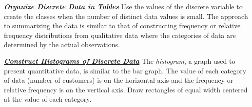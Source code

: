\documentclass{report}
\begin{document}
        \bigbreak \noindent \bigbreak \noindent 
        \textbf{\textit{\underline{Organize Discrete Data in Tables}}}
        \bigbreak \noindent 
        Use the values of the discrete variable to create the classes when the number of distinct data values is small. The approach to summarizing the data is similar to that of constructing frequency or relative frequency distributions from qualitative data where the categories of data are determined by the actual observations.

        \bigbreak \noindent \bigbreak \noindent 
        \textbf{\textit{\underline{Construct Histograms of Discrete Data}}}
        \bigbreak \noindent 
        The \textit{histogram}, a graph used to present quantitative data, is similar to the bar graph.
        \bigbreak \noindent 
        The value of each category of data (number of customers) is on the horizontal axis and the frequency or relative frequency is on the vertical axis. Draw rectangles of equal width centered at the value of each category. 
\end{document}
